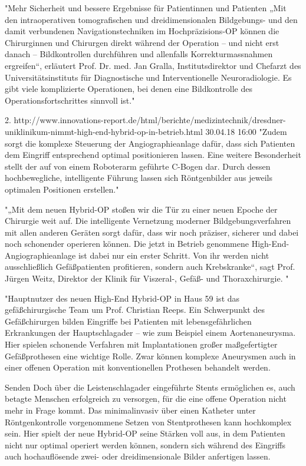 	"Mehr Sicherheit und bessere Ergebnisse für Patientinnen und Patienten
	„Mit den intraoperativen tomografischen und dreidimensionalen Bildgebungs- und den damit verbundenen Navigationstechniken im Hochpräzisions-OP können die Chirurginnen und Chirurgen direkt während der Operation – und nicht erst danach – Bildkontrollen durchführen und allenfalls Korrekturmassnahmen ergreifen“, erläutert Prof. Dr. med. Jan Gralla, Institutsdirektor und Chefarzt des Universitätsinstituts für Diagnostische und Interventionelle Neuroradiologie. Es gibt viele komplizierte Operationen, bei denen eine Bildkontrolle des Operationsfortschrittes sinnvoll ist."

2. http://www.innovations-report.de/html/berichte/medizintechnik/dresdner-uniklinikum-nimmt-high-end-hybrid-op-in-betrieb.html 30.04.18 16:00	
	"Zudem sorgt die komplexe Steuerung der Angiographieanlage dafür, dass sich Patienten dem Eingriff entsprechend optimal positionieren lassen. Eine weitere Besonderheit stellt der auf von einem Roboterarm geführte C-Bogen dar. Durch dessen hochbewegliche, intelligente Führung lassen sich Röntgenbilder aus jeweils optimalen Positionen erstellen."

	"„Mit dem neuen Hybrid-OP stoßen wir die Tür zu einer neuen Epoche der Chirurgie weit auf. Die intelligente Vernetzung moderner Bildgebungsverfahren mit allen anderen Geräten sorgt dafür, dass wir noch präziser, sicherer und dabei noch schonender operieren können. Die jetzt in Betrieb genommene High-End-Angiographieanlage ist dabei nur ein erster Schritt. Von ihr werden nicht ausschließlich Gefäßpatienten profitieren, sondern auch Krebskranke“, sagt Prof. Jürgen Weitz, Direktor der Klinik für Viszeral-, Gefäß- und Thoraxchirurgie. "

	"Hauptnutzer des neuen High-End Hybrid-OP in Haus 59 ist das gefäßchirurgische Team um Prof. Christian Reeps. Ein Schwerpunkt des Gefäßchirurgen bilden Eingriffe bei Patienten mit lebensgefährlichen Erkrankungen der Hauptschlagader – wie zum Beispiel einem Aortenaneurysma. Hier spielen schonende Verfahren mit Implantationen großer maßgefertigter Gefäßprothesen eine wichtige Rolle. Zwar können komplexe Aneurysmen auch in einer offenen Operation mit konventionellen Prothesen behandelt werden.

	Senden	
	Doch über die Leistenschlagader eingeführte Stents ermöglichen es, auch betagte Menschen erfolgreich zu versorgen, für die eine offene Operation nicht mehr in Frage kommt. Das minimalinvasiv über einen Katheter unter Röntgenkontrolle vorgenommene Setzen von Stentprothesen kann hochkomplex sein. Hier spielt der neue Hybrid-OP seine Stärken voll aus, in dem Patienten nicht nur optimal operiert werden können, sondern sich während des Eingriffs auch hochauflösende zwei- oder dreidimensionale Bilder anfertigen lassen.

